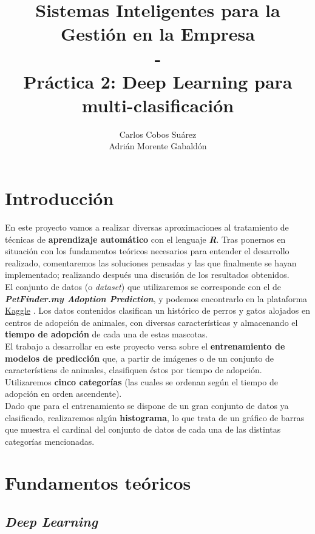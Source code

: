 \documentclass[]{scrartcl}
\title{Sistemas Inteligentes para la Gestión en la Empresa\\-\\Práctica 2: Deep Learning para multi-clasificación}
\author{Carlos Cobos Suárez\\Adrián Morente Gabaldón}
\begin{document}
\maketitle
\newpage
\tableofcontents
\newpage

\section{Introducción}

En este proyecto vamos a realizar diversas aproximaciones al tratamiento de técnicas de \textbf{aprendizaje automático} con el lenguaje \textbf{\textit{R}}. Tras ponernos en situación con los fundamentos teóricos necesarios para entender el desarrollo realizado, comentaremos las soluciones pensadas y las que finalmente se hayan implementado; realizando después una discusión de los resultados obtenidos.\\

El conjunto de datos (o \textit{dataset}) que utilizaremos se corresponde con el de \textbf{\textit{PetFinder.my Adoption Prediction}}, y podemos encontrarlo en la plataforma \href{https://kaggle.com}{Kaggle} \cite{petfinder-dataset}. Los datos contenidos clasifican un histórico de perros y gatos alojados en centros de adopción de animales, con diversas características y almacenando el \textbf{tiempo de adopción} de cada una de estas mascotas.\\

El trabajo a desarrollar en este proyecto versa sobre el \textbf{entrenamiento de modelos de predicción} que, a partir de imágenes o de un conjunto de características de animales, clasifiquen éstos por tiempo de adopción. Utilizaremos \textbf{cinco categorías} (las cuales se ordenan según el tiempo de adopción en orden ascendente).\\

Dado que para el entrenamiento se dispone de un gran conjunto de datos ya clasificado, realizaremos algún \textbf{histograma}, lo que trata de un gráfico de barras que muestra el cardinal del conjunto de datos de cada una de las distintas categorías mencionadas.

\section{Fundamentos teóricos}

	\subsection{\textit{Deep Learning}}
	
\end{document}
